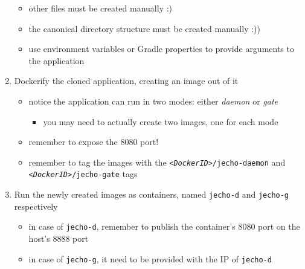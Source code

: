 \documentclass[handout]{beamer}\mode<presentation>{\usetheme{AMSCesenaBleu}}
\begin{document}
\begin{frame}[allowframebreaks]
\begin{enumerate}
\begin{itemize}
            
            \item other files must be created manually :)
            
            \item the canonical directory structure must be created manually :))
            
            \item use \alert{environment variables} or Gradle properties to provide arguments to the application
            
        \end{itemize}
        
        \vspace{.5cm}
        
        \item Dockerify the cloned application, creating an image out of it
        \begin{itemize}
            \item notice the application can run in two modes: either \emph{daemon} or \emph{gate}
            \begin{itemize}
                \item you may need to actually create two images, one for each mode
            \end{itemize}
        
            \item remember to \alert{expose} the 8080 port! 
            
            \item remember to tag the images with the \texttt{\textit{<DockerID>}/jecho-daemon} and \texttt{\textit{<DockerID>}/jecho-gate} tags
        \end{itemize}
        
        \framebreak
        
        \item Run the newly created images as containers, named \texttt{jecho-d} and \texttt{jecho-g} respectively
        \begin{itemize}
            \item in case of \texttt{jecho-d}, remember to \alert{publish} the container's 8080 port on the host's 8888 port 
            
            \item in case of \texttt{jecho-g}, it need to be provided with the IP of \texttt{jecho-d}
            

\end{itemize}
\end{enumerate}
\end{frame}
\end{document}
